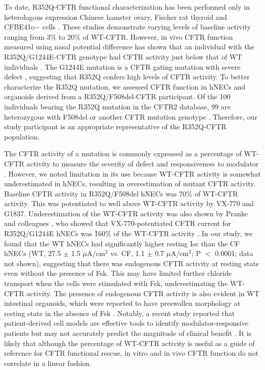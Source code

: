 To date, R352Q-CFTR functional characterization has been performed only in heterologous expression Chinese hamster ovary, Fischer rat thyroid and CFBE41o− cells \cite{guinamard1999, vangoor2014,veit2020}. These studies demonstrate varying levels of baseline activity ranging from 3\% to 20\% of WT-CFTR. However, in vivo CFTR function measured using nasal potential difference has shown that an individual with the R352Q/G1244E-CFTR genotype had CFTR activity just below that of WT individuals \cite{pranke2017}. The G1244E mutation is a CFTR gating mutation with severe defect \cite{cftr2}, suggesting that R352Q confers high levels of CFTR activity. To better characterize the R352Q mutation, we assessed CFTR function in hNECs and organoids derived from a R352Q/F508del-CFTR participant. Of the 100 individuals bearing the R352Q mutation in the CFTR2 database, 99 are heterozygous with F508del or another CFTR mutation genotype \cite{cftr2}. Therefore, our study participant is an appropriate representative of the R352Q-CFTR population.

The CFTR activity of a mutation is commonly expressed as a percentage of WT-CFTR activity to measure the severity of defect and responsiveness to modulator \cite{pranke2017,vangoor2014}. However, we noted limitation in its use because WT-CFTR activity is somewhat underestimated in hNECs, resulting in overestimation of mutant CFTR activity. Baseline CFTR activity in R352Q/F508del hNECs was 70\% of WT-CFTR activity. This was potentiated to well above WT-CFTR activity by VX-770 and G1837. Underestimation of the WT-CFTR activity was also shown by Pranke and colleagues \cite{pranke2017}, who showed that VX-770-potentiated CFTR current for R352Q/G1244E hNECs was \~160\% of the WT-CFTR activity \cite{pranke2017}. In our study, we found that the WT hNECs had significantly higher resting Isc than the CF hNECs (WT, 27.5 $\pm$ 1.5 $\mu$A/cm$^2$ vs. CF, 1.1 $\pm$ 0.7 $\mu$A/cm$^2$; P $<$ 0.0001; data not shown), suggesting that there was endogenous CFTR activity at resting state even without the presence of Fsk. This may have limited further chloride transport when the cells were stimulated with Fsk, underestimating the WT-CFTR activity. The presence of endogenous CFTR activity is also evident in WT intestinal organoids, which were reported to have preswollen morphology at resting state in the absence of Fsk \cite{dekkers2016}. Notably, a recent study reported that patient-derived cell models are effective tools to identify modulator-responsive patients but may not accurately predict the magnitude of clinical benefit \cite{kerem2021}. It is likely that although the percentage of WT-CFTR activity is useful as a guide of reference for CFTR functional rescue, in vitro and in vivo CFTR function do not correlate in a linear fashion.

